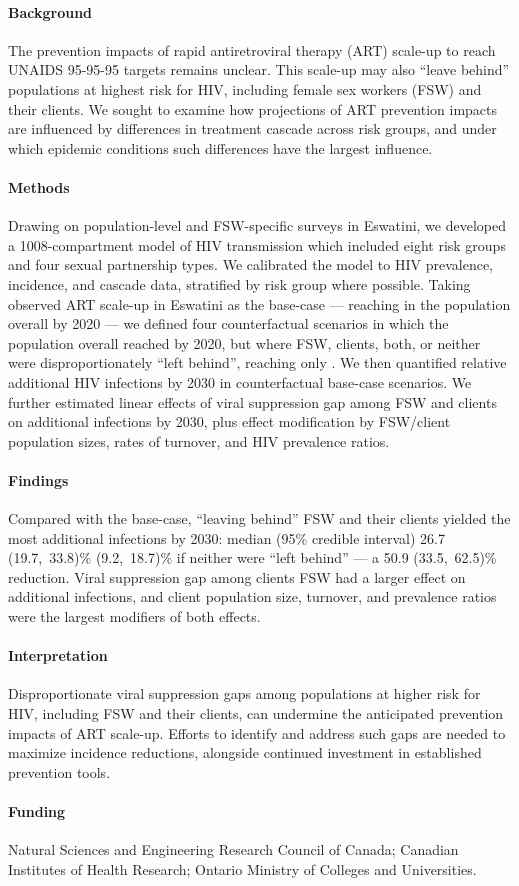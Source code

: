 \paragraph{Background}
The prevention impacts of rapid antiretroviral therapy (ART) scale-up
to reach UNAIDS 95-95-95 targets remains unclear.
This scale-up may also ``leave behind'' populations at highest risk for HIV,
including female sex workers (FSW) and their clients.
We sought to examine
how projections of ART prevention impacts are influenced by
differences in treatment cascade across risk groups, and
under which epidemic conditions such differences have the largest influence.
\paragraph{Methods}
Drawing on population-level and FSW-specific surveys in Eswatini,
we developed a 1008-compartment model of HIV transmission
which included eight risk groups and four sexual partnership types.
We calibrated the model to HIV prevalence, incidence, and cascade data,
stratified by risk group where possible.
Taking observed ART scale-up in Eswatini as the base-case
--- reaching \cashi in the population overall by 2020 ---
we defined four counterfactual scenarios in which
the population overall reached \casmd by 2020,
but where FSW, clients, both, or neither
were disproportionately ``left behind'', reaching only \caslo.
We then quantified relative additional HIV infections by 2030
in counterfactual \vs base-case scenarios.
We further estimated linear effects of
viral suppression gap among FSW and clients on additional infections by 2030, plus
effect modification by FSW/client population sizes, rates of turnover, and HIV prevalence ratios.
\paragraph{Findings}
Compared with the base-case, ``leaving behind'' FSW and their clients
yielded the most additional infections by 2030: median (95\% credible interval)
26.7 (19.7,~33.8)\%  (9.2,~18.7)\% if neither were ``left behind''
--- a 50.9 (33.5,~62.5)\% reduction.
Viral suppression gap among clients \vs FSW had a larger effect on additional infections, and
client population size, turnover, and prevalence ratios were the largest modifiers of both effects.
\paragraph{Interpretation}
Disproportionate viral suppression gaps among populations at higher risk for HIV,
including FSW and their clients,
can undermine the anticipated prevention impacts of ART scale-up.
Efforts to identify and address such gaps are needed to maximize incidence reductions,
alongside continued investment in established prevention tools.
\paragraph{Funding}
Natural Sciences and Engineering Research Council of Canada;
Canadian Institutes of Health Research;
Ontario Ministry of Colleges and Universities.

